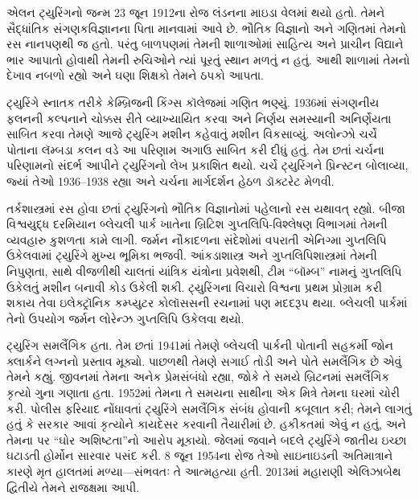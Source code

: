 \documentclass[../../../include/open-logic-section]{subfiles}
\begin{document}




એલન ટ્યુરિંગનો જન્મ 23 જૂન
1912ના રોજ લંડનના માઇડા
વેલમાં થયો હતો. તેમને
સૈદ્ધાંતિક સંગણકવિજ્ઞાનના
પિતા માનવામાં આવે છે.
ભૌતિક વિજ્ઞાનો અને ગણિતમાં
તેમનો રસ નાનપણથી જ હતો.
પરંતુ બાળપણમાં તેમની
શાળાઓમાં સાહિત્ય અને
પ્રાચીન વિદ્યાને ભાર
આપાતો હોવાથી તેમની
રુચિઓને ત્યાં પૂરતું
સ્થાન મળતું ન હતું.
આથી શાળામાં તેમનો
દેખાવ નબળો રહ્યો અને
ઘણા શિક્ષકો તેમને
ઠપકો આપતા.


ટ્યુરિંગે સ્નાતક તરીકે
કેમ્બ્રિજની કિંગ્સ
કૉલેજમાં ગણિત ભણ્યું.
1936માં સંગણનીય
ફલનની કલ્પનાને
ચોક્કસ રીતે વ્યાખ્યાયિત
કરવા અને નિર્ણય
સમસ્યાની અનિર્ણેયતા
સાબિત કરવા તેમણે
આજે ટ્યુરિંગ મશીન
કહેવાતું મશીન વિકસાવ્યું.
અલોન્ઝો ચર્ચે પોતાના
લૅમ્બડા કલન વડે આ
પરિણામ અગાઉ સાબિત
કરી દીધું હતું.
તેમ છતાં ચર્ચના
પરિણામનો સંદર્ભ
આપીને ટ્યુરિંગનો
લેખ પ્રકાશિત થયો.
ચર્ચે ટ્યુરિંગને
પ્રિન્સ્ટન બોલાવ્યા,
જ્યાં તેઓ 1936--1938
રહ્યા અને ચર્ચના
માર્ગદર્શન હેઠળ
ડૉક્ટરેટ મેળવી.

તર્કશાસ્ત્રમાં રસ હોવા
છતાં ટ્યુરિંગનો ભૌતિક
વિજ્ઞાનોમાં પહેલાનો
રસ યથાવત્ રહ્યો.
બીજા વિશ્વયુદ્ધ દરમિયાન
બ્લેચલી પાર્ક ખાતેના
બ્રિટિશ ગુપ્તલિપિ-વિશ્લેષણ
વિભાગમાં તેમની વ્યવહારુ
કુશળતા કામે લાગી.
જર્મન નૌકાદળના
સંદેશોમાં વપરાતી
એનિગ્મા ગુપ્તલિપિ
ઉકેલવામાં ટ્યુરિંગે
મુખ્ય ભૂમિકા ભજવી.
આંકડાશાસ્ત્ર અને
ગુપ્તલિપિશાસ્ત્રમાં
તેમની નિપુણતા,
સાથે વીજળીથી ચાલતાં
યાંત્રિક યંત્રોના પ્રવેશથી,
ટીમ “બૉમ્બ”
નામનું ગુપ્તલિપિ
ઉકેલતું મશીન બનાવી
કોડ ઉકેલી શકી.
ટ્યુરિંગના વિચારો
વિશ્વના પ્રથમ
પ્રોગ્રામ કરી શકાય
તેવા ઇલેક્ટ્રૉનિક
કમ્પ્યુટર કોલૉસસની
રચનામાં પણ મદદરૂપ
થયા. બ્લેચલી
પાર્કમાં તેનો
ઉપયોગ જર્મન
લોરેન્ઝ ગુપ્તલિપિ
ઉકેલવા થયો.

ટ્યુરિંગ સમલૈંગિક
હતા. તેમ છતાં
1941માં તેમણે
બ્લેચલી પાર્કની
પોતાની સહકર્મી
જોન ક્લાર્કને
લગ્નનો પ્રસ્તાવ
મૂક્યો. પાછળથી
તેમણે સગાઈ તોડી
અને પોતે સમલૈંગિક
છે એવું તેમને
કહ્યું. જીવનમાં
તેમના અનેક
પ્રેમસંબંધો રહ્યા,
જોકે તે સમયે
બ્રિટનમાં સમલૈંગિક
કૃત્યો ગુના
ગણાતા હતા.
1952માં તેમના
તે સમયના સાથીના
એક મિત્રે તેમના
ઘરમાં ચોરી કરી.
પોલીસ ફરિયાદ
નોંધાવતાં ટ્યુરિંગે
સમલૈંગિક સંબંધ
હોવાની કબૂલાત
કરી; તેમને
લાગતું હતું કે
સરકાર આવાં
કૃત્યોને કાયદેસર
કરવાની તૈયારીમાં
છે. હકીકતમાં એવું
ન હતું, અને
તેમના પર
“ઘોર અશિષ્ટતા”નો
આરોપ મૂકાયો.
જેલમાં જવાને
બદલે ટ્યુરિંગે
જાતીય ઇચ્છા
ઘટાડતી હોર્મોન
સારવાર પસંદ કરી.
8 જૂન 1954ના
રોજ તેઓ
સાઇનાઇડની
અતિમાત્રાને કારણે
મૃત હાલતમાં
મળ્યા—સંભવતઃ
તે આત્મહત્યા
હતી. 2013માં
મહારાણી એલિઝાબેથ
દ્વિતીયે તેમને
રાજક્ષમા આપી.
\end{document}
